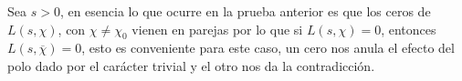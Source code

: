 Sea $s>0$, en esencia lo que ocurre en la prueba anterior es que los ceros de $L(s,\chi)$, con $\chi\neq \chi_0$ vienen en parejas por lo que si $L(s,\chi)=0$, entonces $L(s,\overline{\chi})=0$, esto es conveniente para este caso, un cero nos anula el efecto del polo dado por el carácter trivial y el otro nos da la contradicción.